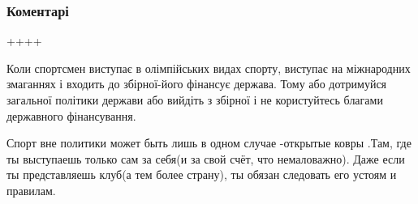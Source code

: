  
 
 
 
 
\subsubsection{Коментарі}
\label{sec:10_08_2021.fb.valianos_anton.1.goruna_maguchih_post.cmt}

\begin{itemize}
 
++++

 

Коли спортсмен виступає в олімпійських видах спорту, виступає на міжнародних
змаганнях і входить до збірної-його фінансує держава. Тому або дотримуйся
загальної політики держави або вийдіть з збірної і не користуйтесь благами
державного фінансування.


 

Спорт вне политики может быть лишь в одном случае -открытые ковры .Там, где ты
выступаешь только сам за себя(и за свой счёт, что немаловажно). Даже если ты
представляешь клуб(а тем более страну), ты обязан следовать его устоям и
правилам.


 


\end{itemize}
